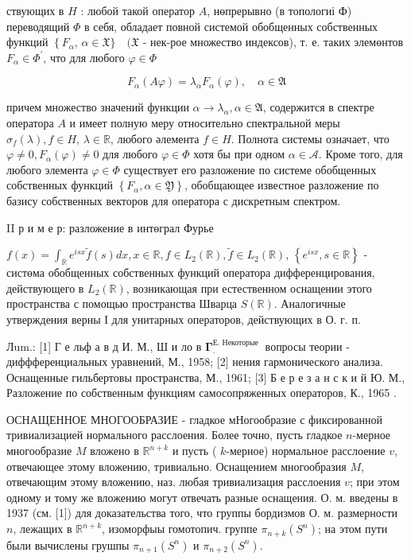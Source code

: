 \documentclass[10pt]{article}
\begin{document}
ствующих в $H$ : любой такой оператор $A$, нөпрерывно (в топологиі Ф) переводящий $\Phi$ в себя, обладает повной системой обобщенных собственных функций $\left\{F_{\alpha}\right.$, $\alpha \in \mathfrak{X}\} \quad(\mathfrak{X}$ - нек-рое множество индексов), т. е. таких элемөнтов $F_{\alpha} \in \Phi^{\prime}$, что для любого $\varphi \in \Phi$

\[
F_{\alpha}(A \varphi)=\lambda_{\alpha} F_{\alpha}(\varphi), \quad \alpha \in \mathfrak{A}
\]

причем множество значений функции $\alpha \rightarrow \lambda_{\alpha}, \alpha \in \mathfrak{A}$, содержится в спектре оператора $A$ и имеет полную меру относительно спектральной меры $\sigma_{f}(\lambda), f \in H$, $\lambda \in \mathbb{R}$, любого әлемента $f \in H$. Полнота системы означает, что $\varphi \neq 0, F_{\alpha}(\varphi) \neq 0$ для любого $\varphi \in \Phi$ хотя бы при одном $\alpha \in \mathscr{A}$. Кроме того, для любого элемента $\varphi \in \Phi$ существует его разложение по системе обобщенных собственных функций $\left\{F_{\alpha}, \alpha \in \mathfrak{Y}\right\}$, обобщающее известное разложение по базису собственных векторов для оператора с дискретным спектром.

II р и м е р: разложение в интөграл Фурье

$f(x)=\int_{\mathbb{R}} e^{i s x} \tilde{f}(s) d x, x \in \mathbb{R}, f \in L_{2}(\mathbb{R}), \tilde{f} \in L_{2}(\mathbb{R})$, $\left\{e^{i s x}, s \in \mathbb{R}\right\}$ - систөма обобщенных собственных функций оператора дифференцирования, действующего в $L_{2}(\mathbb{R})$, возникающая при естественном оснащении этого пространства с помощью пространства Шварца $S(\mathbb{R})$. Аналогичные утверждения верны І для унитарных операторов, действующих в О. г. п.

Лum.: [1] Г е льф а в д И. М., Ш и ло в $\boldsymbol{\Gamma}_{\text {. }}^{\text {Е. Некоторые }}$ вопросы теории - диффференциальных уравнений, М., 1958; [2] нения гармонического анализа. Оснащенные гильбертовы пространства, М., 1961; [3] Б е р е з а н с к и й Ю. М., Разложение по собственным функциям самосопряженных операторов, К.,
1965 .

ОСНАЩЕННОЕ МНОГООБРАЗИЕ - гладкое мНогообразие с фиксированной тривиализацией нормального расслоения. Более точно, пусть гладкое $n$-мерное многообразие $M$ вложено в $\mathbb{R}^{n+k}$ и пусть ( $k$-мерное) нормальное расслоение $v$, отвечающее этому вложению, тривиально. Оснащением многообразия $M$, отвечающим этому вложению, наз. любая тривиализация расслоения $v$; при этом одному и тому же вложению могут отвечать разные оснащения. О. м. введены в 1937 (см. [1]) для доказательства того, что группы бордизмов О. м. размерности $n$, лежащих в $\mathbb{R}^{n+k}$, изоморфыы гомотопич. группе $\pi_{n+k}\left(S^{n}\right)$; на этом пути были вычислены грушпы $\pi_{n+1}\left(S^{n}\right)$ и $\pi_{n+2}\left(S^{n}\right)$.
\end{document}
